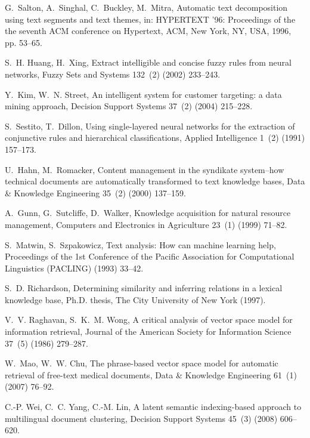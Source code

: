 \documentclass{elsarticle}
\begin{document}
\begin{thebibliography}{10}
G.~Salton, A.~Singhal, C.~Buckley, M.~Mitra, Automatic text decomposition using
  text segments and text themes, in: HYPERTEXT '96: Proceedings of the the
  seventh ACM conference on Hypertext, ACM, New York, NY, USA, 1996, pp.
  53--65.


S.~H. Huang, H.~Xing,
 {Extract intelligible and concise fuzzy rules from
  neural networks}, Fuzzy Sets and Systems 132~(2) (2002) 233--243.


Y.~Kim, W.~N. Street,
  {An intelligent system for customer targeting: a data
  mining approach}, Decision Support Systems 37~(2) (2004) 215--228.


S.~Sestito, T.~Dillon, {Using
  single-layered neural networks for the extraction of conjunctive rules and
  hierarchical classifications}, Applied Intelligence 1~(2) (1991) 157--173.


U.~Hahn, M.~Romacker,
 {Content management in the syndikate system--how
  technical documents are automatically transformed to text knowledge bases},
  Data \& Knowledge Engineering 35~(2) (2000) 137--159.


A.~Gunn, G.~Sutcliffe, D.~Walker,
  {Knowledge acquisition for natural resource
  management}, Computers and Electronics in Agriculture 23~(1) (1999) 71--82.


S.~Matwin, S.~Szpakowicz, Text analysis: How can machine learning help,
  Proceedings of the 1st Conference of the Pacific Association for
  Computational Linguistics (PACLING) (1993) 33--42.

S.~D. Richardson, Determining similarity and inferring relations in a lexical
  knowledge base, Ph.D. thesis, The City University of New York (1997).

V.~V. Raghavan, S.~K.~M. Wong,
 {A critical analysis of vector space model for information retrieval},
  Journal of the American Society for Information Science 37~(5) (1986)
  279--287.

W.~Mao, W.~W. Chu,
 {The phrase-based vector space model for automatic
  retrieval of free-text medical documents}, Data \& Knowledge Engineering
  61~(1) (2007) 76--92.


C.-P. Wei, C.~C. Yang, C.-M. Lin,
  {A latent semantic indexing-based approach to
  multilingual document clustering}, Decision Support Systems 45~(3) (2008)
  606--620.



\end{thebibliography}
\end{document}
